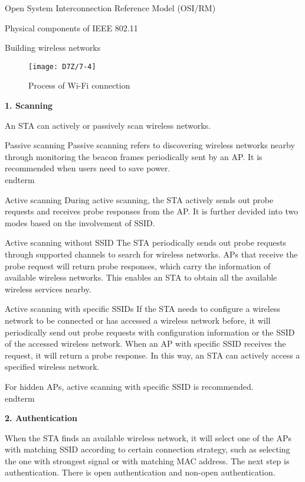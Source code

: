 \documentclass[a4paper,12pt]{book}
\begin{document}
\begin{term}{Open System Interconnection Reference Model (OSI/RM)}
\begin{term}{Physical components of IEEE 802.11}
\begin{term}{Building wireless networks}
\begin{figure}[!h]
    \centering
    \texttt{[image: D7Z/7-4]}
    \caption{Process of Wi-Fi connection}
\end{figure}

\textbf{1. Scanning}

An STA can actively or passively scan wireless networks.

\begin{term}{Passive scanning}
    Passive scanning refers to discovering wireless networks nearby through monitoring the beacon frames periodically sent by an AP. It is recommended when users need to save power.
\\end{term}{}

\begin{term}{Active scanning}
    During active scanning, the STA actively sends out probe requests and receives probe responses from the AP. It is further devided into two modes based on the involvement of SSID.

    \parskip 6pt
    \begin{secterm}{Active scanning without SSID}
        The STA periodically sends out probe requests through supported channels to search for wireless networks. APs that receive the probe request will return probe responses, which carry the information of available wireless networks. This enables an STA to obtain all the available wireless services nearby.
    \end{secterm}

    \begin{secterm}{Active scanning with specific SSIDs}
        If the STA needs to configure a wireless network to be connected or has accessed a wireless network before, it will periodically send out probe requests with configuration information or the SSID of the accessed wireless network. When an AP with specific SSID receives the request, it will return a probe response. In this way, an STA can actively access a specified wireless network.
    \end{secterm}

    For hidden APs, active scanning with specific SSID is recommended.
\\end{term}{}

\textbf{2. Authentication}

When the STA finds an available wireless network, it will select one of the APs with matching SSID according to certain connection strategy, such as selecting the one with strongest signal or with matching MAC address. The next step is authentication. There is open authentication and non-open authentication.


\end{term}
\end{term}
\end{term}
\end{term}
\end{term}
\end{document}
